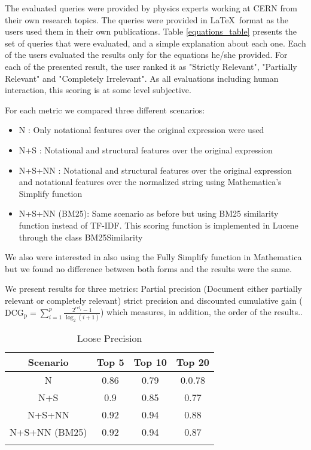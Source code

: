 The evaluated queries were provided by physics experts working at CERN from their own research topics. The queries were provided in \LaTeX\ format as the users used them in their own publications.
Table \ref{equations_table} presents the set of queries that were evaluated, and a simple explanation about each one. 
Each of the users evaluated the results only for the equations he/she provided. For each of the presented result, the user ranked it as "Strictly Relevant", "Partially Relevant" and "Completely Irrelevant". As all evaluations including human interaction, this scoring is at some level subjective. 

For each metric we compared three different scenarios:

\begin{itemize}
\item N : Only notational features over the original expression were used
\item N+S : Notational and structural features over the original expression
\item N+S+NN : Notational and structural features over the original expression and notational features over the normalized string using Mathematica's Simplify function
\item N+S+NN (BM25): Same scenario as before but using BM25 similarity function instead of TF-IDF. This scoring function is implemented in Lucene through the class {\codefont BM25Similarity}
\end{itemize}

We also were interested in also using the Fully Simplify function in Mathematica but we found no difference between both forms and the results were the same.

We present results for three metrics: Partial precision (Document either partially relevant or completely relevant) strict precision and discounted cumulative gain ($ \mathrm{DCG_{p}} = \sum_{i=1}^{p} \frac{ 2^{rel_{i}} - 1 }{ \log_{2}(i+1)} $) which measures, in addition, the order of the results..


\begin{longtable}{|c|c|c|c|}
\hline 
\textbf{Scenario} & \textbf{Top 5} & \textbf{Top 10} & \textbf{Top 20} \\ 
\hline 
N & 0.86 & 0.79 & 0.0.78 \\ 
\hline 
N+S & 0.9 & 0.85 & 0.77 \\ 
\hline 
N+S+NN & 0.92 & 0.94 & 0.88 \\ 
\hline
N+S+NN (BM25) & 0.92 & 0.94 & 0.87 \\ 
\hline
 
\caption{Loose Precision}
\label{loose_precision}
\end{longtable} 

